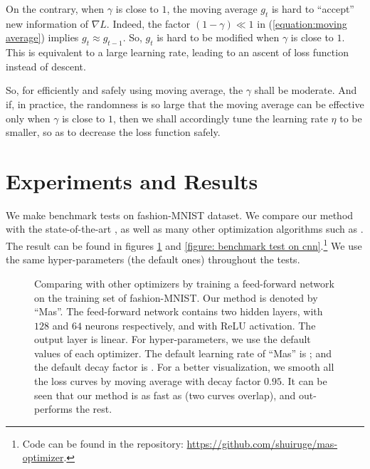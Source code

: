 \documentclass[superscriptaddress,twocolumn,aps,prd,10pt,nofootinbib,preprintnumbers]{revtex4-2}
\newcommand{\tmverbatim}[1]{\text{{\ttfamily{#1}}}}
\begin{document}
On the contrary, when $\gamma$ is close to $1$, the moving average $g_t$ is
hard to ``accept'' new information of $\nabla L$. Indeed, the factor $(1 -
\gamma) \ll 1$ in (\ref{equation:moving average}) implies $g_t \approx g_{t -
1}$. So, $g_t$ is hard to be modified when $\gamma$ is close to $1$. This is
equivalent to a large learning rate, leading to an ascent of loss function
instead of descent.

So, for efficiently and safely using moving average, the $\gamma$ shall be
moderate. And if, in practice, the randomness is so large that the moving
average can be effective only when $\gamma$ is close to $1$, then we shall
accordingly tune the learning rate $\eta$ to be smaller, so as to decrease the
loss function safely.

\section{Experiments and Results}

We make benchmark tests on fashion-MNIST dataset. We compare our method with
the state-of-the-art \tmverbatim{adam}, as well as many other optimization
algorithms such as \tmverbatim{adagrad}. The result can be found in figures
\ref{figure: benchmark test on ffd} and \ref{figure: benchmark test on
cnn}.\footnote{Code can be found in the repository:
\href{https://github.com/shuiruge/mas-optimizer}{https://github.com/shuiruge/mas-optimizer}.}
We use the same hyper-parameters (the default ones) throughout the tests.

\begin{figure}[h]
  \caption{\label{figure: benchmark test on ffd}Comparing with other
  optimizers by training a feed-forward network on the training set of
  fashion-MNIST. Our method is denoted by ``Mas''. The feed-forward network
  contains two hidden layers, with $128$ and $64$ neurons respectively, and
  with ReLU activation. The output layer is linear. For hyper-parameters, we
  use the default values of each optimizer. The default learning rate of
  ``Mas'' is \tmverbatim{2E-4}; and the default decay factor is
  \tmverbatim{0.95}. For a better visualization, we smooth all the loss curves
  by moving average with decay factor $0.95$. It can be seen that our method
  is as fast as \tmverbatim{adam} (two curves overlap), and out-performs the
  rest.}
\end{figure}
\end{document}
